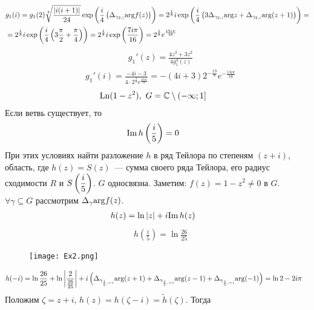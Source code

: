 \begin{align*}
  & g_1(i) = g_1(2) \sqrt[4]{\frac{\left| i(i+1) \right|}{24}} \exp \left( \frac{i}{4}\left( \Delta_{\gamma_{2,i}}\mathrm{arg} f(z) \right) \right) = 2^{\frac{1}{8}}i\exp \left( \frac{i}{4} \left( 3\Delta_{\gamma_{2,i}}\mathrm{arg} z + \Delta_{\gamma_{2,i}} \mathrm{arg} (z+1) \right) \right) = \\
  & = 2^{\frac{1}{8}}i\exp \left( \frac{i}{4} \left( 3\frac{\pi}{2} + \frac{\pi}{4} \right) \right) = 2^{\frac{1}{8}}i\exp \left( \frac{7i\pi}{16} \right) =  2^{\frac{1}{8}}e^{\frac{15i\pi}{16}}
\end{align*}
\begin{align*}
  & g_1'(z) = \frac{4z^3+3z^2}{4g_1^3(z)}
\end{align*}
\begin{align*}
  & g_1'(i) = \frac{-4i -3}{4\cdot 2^{\frac{3}{8}}e^{\frac{45i\pi}{16}}} = -(4i+3)2^{-\frac{19}{8}}e^{-\frac{13i\pi}{16}}
\end{align*}
\Example
\begin{align*}
  & \mathrm{Ln} (1-z^2), \ G = \mathbb{C} \setminus (-\infty; 1]
\end{align*}
Если ветвь существует, то
\begin{align*}
  & \mathrm{Im}\, h\left( \frac{i}{5} \right) = 0
\end{align*}
При этих условиях найти разложение $h$ в ряд Тейлора по степеням $(z+i)$,
область, где $h(z) = S(z)$~--- сумма своего ряда Тейлора, его радиус сходимости
$R$ и $S\left( \displaystyle \frac{i}{5} \right)$.
\nonum
$G$ односвязна. Заметим: $f(z) = 1-z^2 \neq 0$ в $G$.
\\
$\forall \gamma \subseteq G$ рассмотрим $\Delta_{\gamma}\mathrm{arg} f(z)$.
\begin{align*}
  & h(z) = \ln \left| z \right| + i \mathrm{Im}\, h(z)
\end{align*}
\begin{align*}
  & h\left( \frac{i}{5} \right) = \ln \frac{26}{25}
\end{align*}
\begin{figure}[h!]
		\centering
		\texttt{[image: Ex2.png]}
		\label{fig:17.2}
\end{figure}
\begin{align*}
  & h(-i) = \ln \frac{26}{25} + \ln \left| \frac{2}{\frac{26}{25}} \right|+ i\left( \Delta_{\gamma_{\frac{i}{5}, -i}}\mathrm{arg} (z+1) + \Delta_{\gamma_{\frac{i}{5}, -i}}\mathrm{arg} (z-1) + \Delta_{\gamma_{\frac{i}{5}, -i}}\mathrm{arg} (-1) \right) = \ln 2 - 2 i \pi
\end{align*}
Положим $\zeta = z+i$, $h(z) = h(\zeta - i) = \tilde{h}(\zeta)$. Тогда
